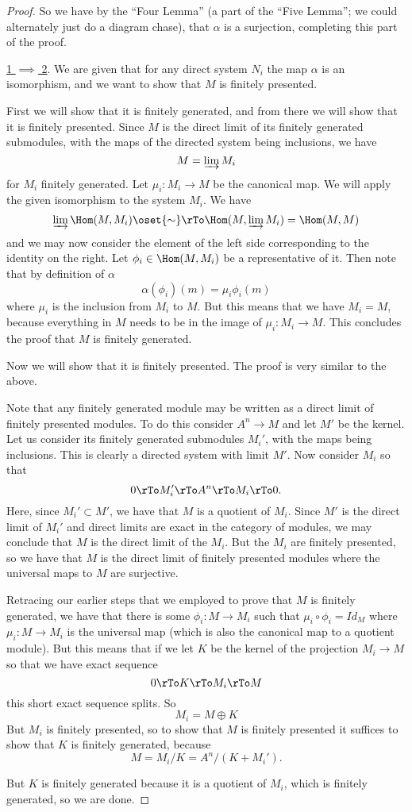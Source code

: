 \documentclass[12 pt]{article}
\theoremstyle{definition}
\renewcommand{\(}{\left(}
\renewcommand{\)}{\right)}
\begin{document}
\begin{proof}
So we have by the ``Four Lemma'' (a part of the ``Five Lemma''; we could alternately just do a diagram chase), that $\alpha$ is a surjection, completing this part of the proof.



\underline{1 $\implies$ 2}. We are given that for any direct system $N_i$ the map $\alpha$ is an isomorphism, and we want to show that $M$ is finitely presented.

First we will show that it is finitely generated, and from there we will show that it is finitely presented. Since $M$ is the direct limit of its finitely generated submodules, with the maps of the directed system being inclusions, we have
\[M=\varinjlim M_i\]
for $M_i$ finitely generated. Let $\mu_i:M_i \to M$ be the canonical map. We will apply the given isomorphism to the system $M_i$. We have
\[\varinjlim \Hom(M, M_i) \oset{\sim}\rTo \Hom(M, \varinjlim M_i)=\Hom(M,M)\]
and we may now consider the element of the left side corresponding to the identity on the right. Let $\phi_i \in \Hom(M, M_i)$ be a representative of it. Then note that by definition of $\alpha$
\[\alpha(\phi_i)(m)=\mu_i\phi_i(m)\]
where $\mu_i$ is the inclusion from $M_i$ to $M$. But this means that we have $M_i=M$, because everything in $M$ needs to be in the image of $\mu_i:M_i \to M$. This concludes the proof that $M$ is finitely generated.

Now we will show that it is finitely presented. The proof is very similar to the above.

Note that any finitely generated module may be written as a direct limit of finitely presented modules. To do this consider $A^n \to M$ and let $M'$ be the kernel. Let us consider its finitely generated submodules $M_i'$, with the maps being inclusions. This is clearly a directed system with limit $M'$.
Now consider $M_i$ so that
\[0 \rTo M_i' \rTo A^n \rTo M_i \rTo 0.\]
Here, since $M_i' \subset M'$, we have that $M$ is a quotient of $M_i$. Since $M'$ is the direct limit of $M_i'$ and direct limits are exact in the category of modules, we may conclude that $M$ is the direct limit of the $M_i$. But the $M_i$ are finitely presented, so we have that $M$ is the direct limit of finitely presented modules where the universal maps to $M$ are surjective.


Retracing our earlier steps that we employed to prove that $M$ is finitely generated, we have that there is some $\phi_i:M \to M_i$ such that $\mu_i\circ \phi_i=Id_M$ where $\mu_i:M \to M_i$ is the universal map (which is also the canonical map to a quotient module). But this means that if we let $K$ be the kernel of the projection $M_i \to M$ so that we have exact sequence
\[0 \rTo K \rTo M_i \rTo M\]
this short exact sequence splits. So
\[M_i=M \oplus K\]
But $M_i$ is finitely presented, so to show that $M$ is finitely presented it suffices to show that $K$ is finitely generated, because
\[M=M_i/K=A^n/(K+M_i').\]

But $K$ is finitely generated because it is a quotient of $M_i$, which is finitely generated, so we are done.






\end{proof}
\end{document}
